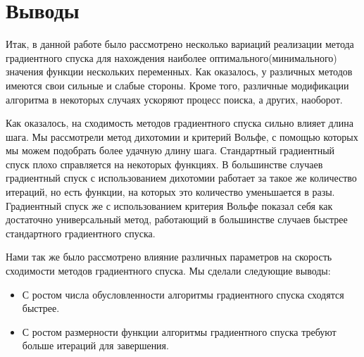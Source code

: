\chapter{Выводы}
\label{ch:tab}

Итак, в данной работе было рассмотрено несколько вариаций реализации метода градиентного спуска для нахождения наиболее оптимального(минимального) значения функции нескольких переменных. Как оказалось, у различных методов имеются свои сильные и слабые стороны. Кроме того, различные модификации алгоритма в некоторых случаях ускоряют процесс поиска, а других, наоборот.

    Как оказалось, на сходимость методов градиентного спуска сильно влияет длина шага. Мы рассмотрели метод дихотомии и критерий Вольфе, с помощью которых мы можем подобрать более удачную длину шага. Стандартный градиентный спуск плохо справляется на некоторых функциях. В большинстве случаев градиентный спуск с использованием дихотомии работает за такое же количество итераций, но есть функции, на которых это количество уменьшается в разы. Градиентный спуск же с использованием критерия Вольфе показал себя как достаточно универсальный метод, работающий в большинстве случаев быстрее стандартного градиентного спуска.

    Нами так же было рассмотрено влияние различных параметров на скорость сходимости методов градиентного спуска. Мы сделали следующие выводы:
    \begin{itemize}
        \item С ростом числа обусловленности алгоритмы градиентного спуска сходятся быстрее.
        \item С ростом размерности функции алгоритмы градиентного спуска требуют больше итераций для завершения.
    \end{itemize}

\endinput